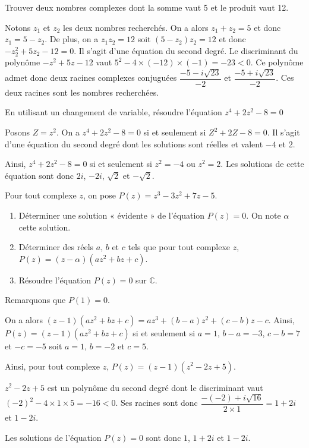 \documentclass[11pt,fleqn, openany]{book} %
\begin{document}
\begin{exercise}[topic=cpx04]Trouver deux nombres complexes dont la somme vaut 5 et le produit vaut 12.\end{exercise}

\begin{solution}Notons $z_1$ et $z_2$ les deux nombres recherchés. On a alors $z_1+z_2=5$ et donc $z_1=5-z_2$. De plus, on a $z_1z_2=12$ soit $(5-z_2)z_2=12$ et donc $-z_2^2+5z_2-12=0$. Il s'agit d'une équation du second degré. Le discriminant du polynôme $-z^2+5z-12$ vaut $5^2-4 \times (-12) \times (-1) = -23<0$. Ce polynôme admet donc deux racines complexes conjuguées $\dfrac{-5-i\sqrt{23}}{-2}$ et $\dfrac{-5+i\sqrt{23}}{-2}$. Ces deux racines sont les nombres recherchées.\end{solution}

\begin{exercise}[topic=cpx04]En utilisant un changement de variable, résoudre l'équation $z^4+2z^2-8=0$\end{exercise}

\begin{solution}
Posons $Z=z^2$. On a $z^4+2z^2-8=0$ si et seulement si $Z^2+2Z-8=0$. Il s'agit d'une équation du second degré dont les solutions sont réelles et valent $-4$ et 2. 

Ainsi, $z^4+2z^2-8=0$ si et seulement si $z^2=-4$ ou $z^2=2$. Les solutions de cette équation sont donc $2i$, $-2i$, $\sqrt{2}$ et $-\sqrt{2}$.
\end{solution}

\begin{exercise}[topic=cpx04]Pour tout complexe $z$, on pose $P(z)=z^3-3z^2+7z-5$.
\begin{enumerate}
\item Déterminer une solution « évidente » de l'équation $P(z)=0$. On note $\alpha$ cette solution.
\item Déterminer des réels $a$, $b$ et $c$ tels que pour tout complexe $z$, $P(z)=(z-\alpha)(az^2+bz+c)$.
\item Résoudre l'équation $P(z)=0$ sur $\mathbb{C}$.
\end{enumerate}\end{exercise}

\begin{solution}
Remarquons que $P(1)=0$.

On a alors $(z-1)(az^2+bz+c)=az^3+(b-a)z^2+(c-b)z-c$. Ainsi, $P(z)=(z-1)(az^2+bz+c)$ si et seulement si $a=1$, $b-a=-3$, $c-b=7$ et $-c=-5$ soit  $a=1$, $b=-2$ et $c=5$.

Ainsi, pour tout complexe $z$, $P(z)=(z-1)(z^2-2z+5)$.

$z^2-2z+5$ est un polynôme du second degré dont le discriminant vaut $(-2)^2-4\times 1 \times 5=-16<0$. Ses racines sont donc $\dfrac{-(-2)+i\sqrt{16}}{2 \times 1}=1+2i$ et $1-2i$.

Les solutions de l'équation $P(z)=0$ sont donc $1$, $1+2i$ et $1-2i$.
\end{solution}
\end{document}
